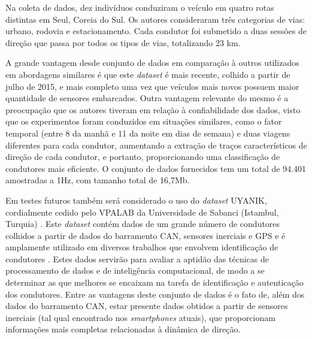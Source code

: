 Na coleta de dados, dez indivíduos conduziram o veículo em quatro rotas distintas em Seul, Coreia do Sul. Os autores consideraram três categorias de vias: urbano, rodovia e estacionamento. Cada condutor foi submetido a duas sessões de direção que passa por todos os tipos de vias, totalizando 23 km.

A grande vantagem desde conjunto de dados em comparação à outros utilizados em abordagens similares é que este \textit{dataset} é mais recente, colhido a partir de julho de 2015, e mais completo uma vez que veículos mais novos possuem maior quantidade de sensores embarcados. Outra vantagem relevante do mesmo é a preocupação que os autores tiveram em relação à confiabilidade dos dados, visto que os experimentos foram conduzidos em situações similares, como o fator temporal (entre 8 da manhã e 11 da noite em dias de semana) e duas viagens diferentes para cada condutor, aumentando a extração de traços característicos de direção de cada condutor, e portanto, proporcionando uma classificação de condutores mais eficiente. O conjunto de dados fornecidos tem um total de 94.401 amostradas a 1Hz, com tamanho total de 16,7Mb.

Em testes futuros também será considerado o uso do \textit{dataset} UYANIK, cordialmente cedido pelo VPALAB da Universidade de Sabanci (Istambul, Turquia) \cite{Abut2007}. Este \textit{dataset} contém dados de um grande número de condutores colhidos a partir de dados do barramento CAN, sensores inerciais e GPS e é amplamente utilizado em diversos trabalhos que envolvem identificação de condutores \cite{Martinez2016a} \cite{jafarnejad2017} \cite{DelCampo2014}. Estes dados servirão para avaliar a aptidão das técnicas de processamento de dados e de inteligência computacional, de modo a se determinar as que melhores se encaixam na tarefa de identificação e autenticação dos condutores. Entre as vantagens deste conjunto de dados é o fato de, além dos dados do barramento CAN, estar presente dados obtidos a partir de sensores inerciais (tal qual encontrado nos \textit{smartphones} atuais), que proporcionam informações mais completas relacionadas à dinâmica de direção.

